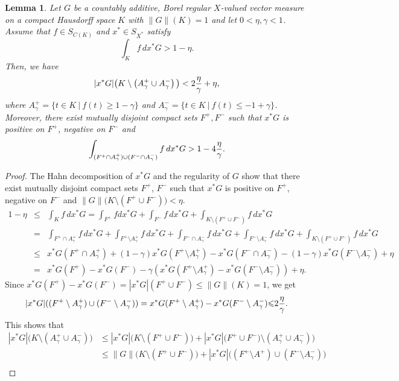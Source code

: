 \documentclass[a4paper]{amsart}
\theoremstyle{plain}
\newtheorem{lemma}[theorem]{Lemma}
\theoremstyle{definition}
\begin{document}
\begin{lemma}\label{uniform1} Let  $G$ be a countably additive, Borel regular $X$-valued vector measure on a compact Hausdorff space $K$ with $\|G\|(K)=1$ and let  $0<\eta,\gamma<1$. Assume that $f\in S_{C(K)}$ and $x^*\in S_{X^*}$ satisfy  $$\int_K f \, dx^*G>1-\eta.$$
Then, we have \[|x^*G|\big(K\setminus \left(A^+_{\gamma}\cup A^-_{\gamma}\right)\big)<2{{\eta}\over{\gamma}}+\eta,\] where
$A^+_{\gamma}=\{t\in K~|~f(t){\geqslant}1-\gamma\}$ and  $A^-_{\gamma}=\{t\in K~|~f(t){\leqslant}-1+\gamma\}$. Moreover, there exist mutually disjoint compact sets $F^+, F^-$ such that $x^*G$ is positive on $F^+$, negative on $F^-$ and $$\int_{(F^+\cap A^+_{\gamma})\cup(F^-\cap A^-_{\gamma})} f\, dx^*G>1-4{{\eta}\over{\gamma}}.$$
\end{lemma}
\begin{proof}
The Hahn decomposition of $x^*G$ and the regularity of $G$ show that there exist mutually disjoint compact sets $F^+$, $F^-$ such that  $x^*G$ is positive on $F^+$, negative on $F^-$ and $\|G\|\big(K\setminus (F^+\cup F^-)\big)<\eta$.
\begin{eqnarray*}
 1-\eta
 &{\leqslant}&\int_K f\, d x^*G = \int_{F^+} f d x^*G+ \int_{F^-} f\,d x^*G+\int_{K\setminus  (F^+\cup F^-)}f\,dx^*G\\
 &=& \int_{F^+\cap A^+_{\gamma}} f\, d x^*G+ \int_{F^+\setminus A^+_{\gamma}}f\, d x^*G+\int_{F^-\cap A^-_{\gamma}} f \,d x^*G+ \int_{F^-\setminus A^-_{\gamma}}f\, d x^*G+\int_{K\setminus  (F^+\cup F^-)}f\,dx^*G\\
 &{\leqslant}& x^*G(F^+\cap A^+_{\gamma})+(1-\gamma)x^*G(F^+\setminus A^+_{\gamma})-x^*G(F^-\cap A^-_{\gamma})-(1-\gamma)x^*G(F^-\setminus A^-_{\gamma})+\eta\\
 &=&x^*G(F^+)-x^*G(F^-)-\gamma(x^*G(F^+\setminus A^+_{\gamma})-x^*G(F^-\setminus A^-_{\gamma}))+\eta.
 \end{eqnarray*}
 Since
 $ x^*G(F^+)-x^*G(F^-)= |x^*G|(F^+\cup F^-) \le \|G\|(K)= 1$,
 we get
 $$|x^*G|((F^+\setminus A^+_{\gamma}) \cup (F^-\setminus A^-_{\gamma}))= x^*G(F^+\setminus A^+_{\gamma})-x^*G(F^-\setminus A^-_{\gamma}){\leqslant} 2{{\eta}\over{\gamma}}.$$
 This shows that
\begin{align*}
|x^*G|\big(K\setminus \left(A^+_{\gamma}\cup A^-_{\gamma}\right)\big)  & {\leqslant}  |x^*G|\big(K\setminus (F^+\cup F^-)) + |x^*G|\big(F^+\cup F^-) \setminus  \left(A^+_{\gamma}\cup A^-_{\gamma}\right)\big)\\
&{\leqslant}  \|G\|\big(K\setminus (F^+\cup F^-)) + |x^*G|\big( (F^+\setminus A^+) \cup ( F^-\setminus  A^-_{\gamma})\big)\\

\end{align*}
\end{proof}
\end{document}

